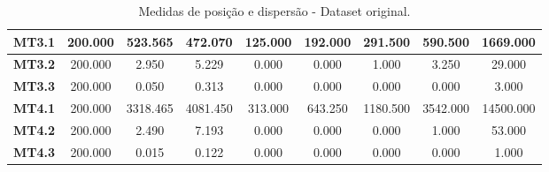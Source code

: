 \documentclass[
	article,			%
	11pt,				%
	oneside,			%
	a4paper,			%
	english,			%
	brazil,				%
	sumario=tradicional
	]{abntex2}
\begin{document}
\begin{table}[h!]
\begin{tabular}{l|c|c|c|c|c|c|c|c|}
\multicolumn{1}{|l|}{\textbf{MT3.1}}  & 200.000 & 523.565  & 472.070  & 125.000 & 192.000 & 291.500  & 590.500  & 1669.000  \\ \hline
\multicolumn{1}{|l|}{\textbf{MT3.2}}  & 200.000 & 2.950    & 5.229    & 0.000   & 0.000   & 1.000    & 3.250    & 29.000    \\ \hline
\multicolumn{1}{|l|}{\textbf{MT3.3}}  & 200.000 & 0.050    & 0.313    & 0.000   & 0.000   & 0.000    & 0.000    & 3.000     \\ \hline
\multicolumn{1}{|l|}{\textbf{MT4.1}}  & 200.000 & 3318.465 & 4081.450 & 313.000 & 643.250 & 1180.500 & 3542.000 & 14500.000 \\ \hline
\multicolumn{1}{|l|}{\textbf{MT4.2}}  & 200.000 & 2.490    & 7.193    & 0.000   & 0.000   & 0.000    & 1.000    & 53.000    \\ \hline
\multicolumn{1}{|l|}{\textbf{MT4.3}}  & 200.000 & 0.015    & 0.122    & 0.000   & 0.000   & 0.000    & 0.000    & 1.000     \\ \hline
\end{tabular}
\caption{Medidas de posição e dispersão - Dataset original.}
\label{tab:est_ori}
\end{table}
\end{document}
